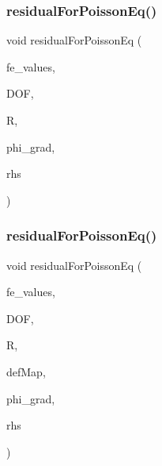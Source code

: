 \subsubsection{\texorpdfstring{residualForPoissonEq()}{residualForPoissonEq()}\hspace{0.1cm}{\footnotesize\ttfamily [3/4]}}
{\footnotesize\ttfamily void residual\+For\+Poisson\+Eq (\begin{DoxyParamCaption}\item[{const F\+E\+Values$<$ dim $>$ \&}]{fe\+\_\+values,  }\item[{unsigned int}]{D\+OF,  }\item[{dealii\+::\+Table$<$ 1, T $>$ \&}]{R,  }\item[{dealii\+::\+Table$<$ 3, T $>$ \&}]{phi\+\_\+grad,  }\item[{dealii\+::\+Table$<$ 2, T $>$ \&}]{rhs }\end{DoxyParamCaption})}

\mbox{\label{class_residual_ada0899a86c88ceb84cc3c1155663b8ba}} 
\subsubsection{\texorpdfstring{residualForPoissonEq()}{residualForPoissonEq()}\hspace{0.1cm}{\footnotesize\ttfamily [4/4]}}
{\footnotesize\ttfamily void residual\+For\+Poisson\+Eq (\begin{DoxyParamCaption}\item[{const F\+E\+Values$<$ dim $>$ \&}]{fe\+\_\+values,  }\item[{unsigned int}]{D\+OF,  }\item[{dealii\+::\+Table$<$ 1, T $>$ \&}]{R,  }\item[{\mbox{\hyperlink{structdeformation_map}{deformation\+Map}}$<$ T, dim $>$ \&}]{def\+Map,  }\item[{dealii\+::\+Table$<$ 3, T $>$ \&}]{phi\+\_\+grad,  }\item[{dealii\+::\+Table$<$ 2, T $>$ \&}]{rhs }\end{DoxyParamCaption})}

\mbox{\label{class_residual_a9a8f493fb66e0bd394948af13a27d821}} 

